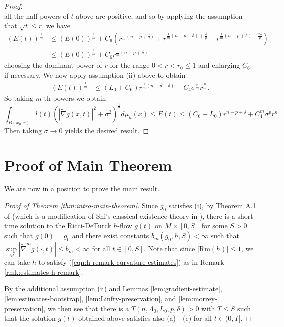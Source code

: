 \documentclass[12pt]{amsart}
\theoremstyle{plain}
\theoremstyle{plain}
\theoremstyle{definition}
\theoremstyle{remark}
\numberwithin{equation}{subsection}
\newcommand{\hdel}{\tilde{\nabla}}
\begin{document}
\begin{proof}
\begin{equation*}
    \end{equation*}
    all the half-powers of $t$ above are positive, and so by applying the assumption that $\sqrt{t}\leq r$, we have
    \begin{align*}
        \left(E(t)\right)^{\frac{1}{m}} &\leq \left(E(0)\right)^\frac{1}{m} + C_6\left(r^{\frac{1}{m}\left(n-p+\delta\right)} + r^{\frac{1}{m}\left(n-p+\delta\right)+\frac{\delta}{p}} + r^{\frac{1}{m}\left(n-p+\delta\right)+\frac{2\delta}{p}}\right) \nonumber \\
        &\leq \left(E(0)\right)^\frac{1}{m} + C_6r^{\frac{1}{m}\left(n-p+\delta\right)}
    \end{align*}
    choosing the dominant power of $r$ for the range $0 < r < r_0 \leq 1$ and enlarging $C_6$ if necessary. We now apply assumption (ii) above to obtain
    \begin{align*}
        \left(E(t)\right)^{\frac{1}{m}} &\leq (L_0 + C_6)r^{\frac{1}{m}\left(n-p+\delta\right)} + C_4\sigma^\frac{p}{m}r^{\frac{n}{m}}.
    \end{align*}
    So taking $m$-th powers we obtain
    \begin{equation*}
        \int_{B(x_0, r)} l(t)\left(|\hdel g(x,t)|^2 + \sigma^2\right)^{\frac{1}{2}}d\mu_h(x) \leq E(t) \leq (C_6+L_0)r^{n-p+\delta} + C_4^m\sigma^p r^n.
    \end{equation*}
    Then taking $\sigma \to 0$ yields the desired result.
\end{proof}

\section{Proof of Main Theorem}\label{sec:proof-of-main-theorem}

We are now in a position to prove the main result.

\begin{proof}[Proof of Theorem \ref{thm:intro-main-theorem}]
    Since $g_0$ satisfies (i), by Theorem A.1 of \cite{lamm_ricci_2021} (which is a modification of Shi's classical existence theory in \cite{shi_deforming_1989}), there is a short-time solution to the Ricci-DeTurck $h$-flow $g(t)$ on $M \times [0,S]$ for some $S > 0$ such that $g(0) = g_0$ and there exist constants $b_m(g_0, h, S) < \infty$ such that $\sup\limits_M |\hdel^m g(\cdot, t)| \leq b_m < \infty$ for all $t \in [0, S]$. Note that since $|\text{Rm}(h)|\leq 1$, we can take $h$ to satisfy (\ref{eqn:h-remark-curvature-estimates}) as in Remark \ref{rmk:estimates-h-remark}.

    By the additional assumption (ii) and Lemmas \ref{lem:gradient-estimate}, \ref{lem:estimates-bootstrap}, \ref{lem:Linfty-preservation}, and \ref{lem:morrey-preservation}, we then see that there is a $T(n, \Lambda_0, L_0, p, \delta) > 0$ with $T \leq S$ such that the solution $g(t)$ obtained above satisfies also (a) - (c) for all $t \in (0, T]$.
\end{proof}
\end{document}
